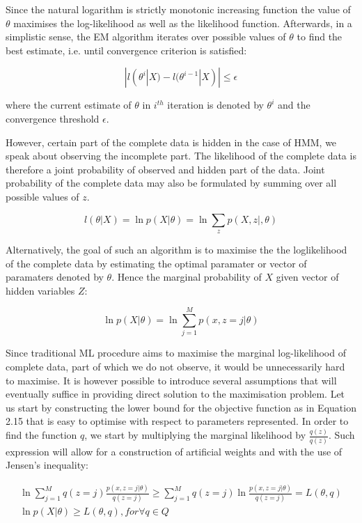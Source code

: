 Since the natural logarithm is strictly monotonic increasing function the value of $\theta$ maximises the log-likelihood as well as the likelihood function. Afterwards, in a simplistic sense, the EM algorithm iterates over possible values of $\theta$ to find the best estimate, i.e. until convergence criterion is satisfied:

\begin{equation}
|l(\theta^i|X) - l(\theta^{i-1}|X)| \leq \epsilon 
\end{equation}

where the current estimate of $\theta$ in $i^{th}$ iteration is denoted by $\theta^i$ and the convergence threshold $\epsilon$. 

However, certain part of the complete data is hidden in the case of HMM, we speak about observing the incomplete part. The likelihood of the complete data is therefore a joint probability of observed and hidden part of the data. Joint probability of the complete data may also be formulated by summing over all possible values of $z$. 

\begin{equation}
l(\theta|X)  = \ln p(X|\theta) = \ln \sum_z p(X,z|,\theta)
\end{equation}

Alternatively, the goal of such an algorithm is to maximise the the loglikelihood of the complete data by estimating the optimal paramater or vector of paramaters denoted by $\theta$. Hence the marginal probability of $X$ given vector of hidden variables $Z$:

\begin{equation}
\ln p(X|\theta) = \ln \sum_{j=1}^{M} p(x, z = j|\theta)
\end{equation}

Since traditional ML procedure aims to maximise the marginal log-likelihood of complete data, part of which we do not observe, it would be unnecessarily hard to maximise. It is however possible to introduce several assumptions that will eventually suffice in providing direct solution to the maximisation problem.  Let us start by constructing the lower bound for the objective function as in Equation 2.15 that is easy to optimise with respect to parameters represented. In order to find the function $q$, we start by multiplying the marginal likelihood by $\frac{q(z)}{q(z)}$. Such expression will allow for a construction of artificial weights and with the use of Jensen's inequality:

\begin{gather}
\ln \sum_{j=1}^{M} q(z = j) \frac{p(x, z = j|\theta)}{q(z = j)}  \geq \sum_{j=1}^{M} q(z = j) \ln \frac{p(x, z = j|\theta)}{q(z = j)} = L(\theta,q) \\
\ln p(X|\theta) \geq L(\theta,q), for \forall q \in Q
\end{gather}

